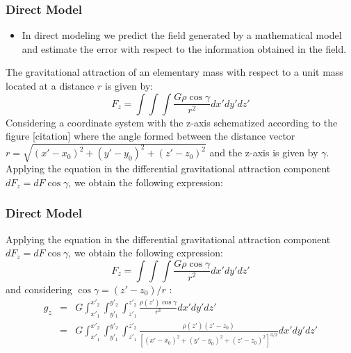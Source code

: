 \documentclass{beamer}
\begin{document}
\begin{frame}
\frametitle{Direct Model}

\begin{itemize}
\item In direct modeling we predict the field generated by a mathematical model and estimate the error with respect to the information obtained in the field.
\end{itemize}
The gravitational attraction of an elementary mass with respect to a unit mass located at a distance $r$ is given by:
\begin{equation}
F_{z} = \int \int \int \frac{G\rho\cos{\gamma} }{{r}^2} dx' dy' dz' 
\end{equation}
Considering a coordinate system with the z-axis schematized according to the figure [citation] where the angle formed between the distance vector $r=\sqrt{(x'-x_0)^2+(y'-y_0)^2+(z'-z_0)^2}$ and the z-axis is given by $ \gamma $. Applying the equation in the differential gravitational attraction component$dF_{z} = dF \cos{\gamma} $, we obtain the following expression:
\end{frame}


\begin{frame}
\frametitle{Direct Model}
 Applying the equation in the differential gravitational attraction component$dF_{z} = dF \cos{\gamma} $, we obtain the following expression:
 \begin{equation}
F_{z} = \int \int \int \frac{G\rho\cos{\gamma} }{{r}^2} dx' dy' dz' 
\end{equation}
and considering $\cos{\gamma} = (z'-z_0)/r$ :
\begin{eqnarray}
g_z &=& G \int_{x'_1}^{x'_2} \int_{y'_1}^{y'_2} \int_{z'_1}^{z'_2} \frac{\rho(z')\cos{\gamma} }{{r}^3} dx' dy' dz' \nonumber \\ 
&=& G \int_{x'_1}^{x'_2} \int_{y'_1}^{y'_2} \int_{z'_1}^{z'_2} \frac{\rho(z')(z'-z_0)}{ {\left[(x'-x_0)^2+(y'-y_0)^2+(z'-z_0)^2\right]} ^{3/2} } dx' dy' dz'  \nonumber \\
\end{eqnarray}
\end{frame}


\end{document}

